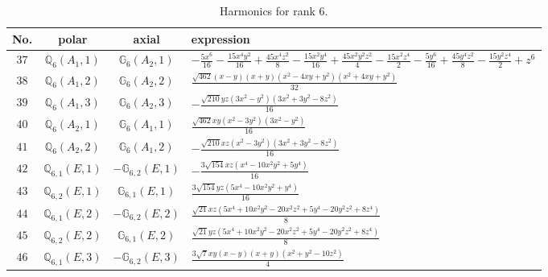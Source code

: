 \documentclass[fleqn,8pt,landscape]{jsarticle}
\begin{document}
\begin{table}[ht!]
\begin{center}
\caption{Harmonics for rank 6.}
\renewcommand{\arraystretch}{1.3}
\begin{tabular}{cccl} \hline \hline
No. & polar & axial & expression \\ \hline
$ 37 $ & $ \mathbb{Q}_{6}(A_{1},1) $ & $ \mathbb{G}_{6}(A_{2},1) $ & $ - \frac{5 x^{6}}{16} - \frac{15 x^{4} y^{2}}{16} + \frac{45 x^{4} z^{2}}{8} - \frac{15 x^{2} y^{4}}{16} + \frac{45 x^{2} y^{2} z^{2}}{4} - \frac{15 x^{2} z^{4}}{2} - \frac{5 y^{6}}{16} + \frac{45 y^{4} z^{2}}{8} - \frac{15 y^{2} z^{4}}{2} + z^{6} $ \\
$ 38 $ & $ \mathbb{Q}_{6}(A_{1},2) $ & $ \mathbb{G}_{6}(A_{2},2) $ & $ \frac{\sqrt{462} \left(x - y\right) \left(x + y\right) \left(x^{2} - 4 x y + y^{2}\right) \left(x^{2} + 4 x y + y^{2}\right)}{32} $ \\
$ 39 $ & $ \mathbb{Q}_{6}(A_{1},3) $ & $ \mathbb{G}_{6}(A_{2},3) $ & $ - \frac{\sqrt{210} y z \left(3 x^{2} - y^{2}\right) \left(3 x^{2} + 3 y^{2} - 8 z^{2}\right)}{16} $ \\
$ 40 $ & $ \mathbb{Q}_{6}(A_{2},1) $ & $ \mathbb{G}_{6}(A_{1},1) $ & $ \frac{\sqrt{462} x y \left(x^{2} - 3 y^{2}\right) \left(3 x^{2} - y^{2}\right)}{16} $ \\
$ 41 $ & $ \mathbb{Q}_{6}(A_{2},2) $ & $ \mathbb{G}_{6}(A_{1},2) $ & $ - \frac{\sqrt{210} x z \left(x^{2} - 3 y^{2}\right) \left(3 x^{2} + 3 y^{2} - 8 z^{2}\right)}{16} $ \\
$ 42 $ & $ \mathbb{Q}_{6,1}(E,1) $ & $ -\mathbb{G}_{6,2}(E,1) $ & $ - \frac{3 \sqrt{154} x z \left(x^{4} - 10 x^{2} y^{2} + 5 y^{4}\right)}{16} $ \\
$ 43 $ & $ \mathbb{Q}_{6,2}(E,1) $ & $ \mathbb{G}_{6,1}(E,1) $ & $ \frac{3 \sqrt{154} y z \left(5 x^{4} - 10 x^{2} y^{2} + y^{4}\right)}{16} $ \\
$ 44 $ & $ \mathbb{Q}_{6,1}(E,2) $ & $ -\mathbb{G}_{6,2}(E,2) $ & $ \frac{\sqrt{21} x z \left(5 x^{4} + 10 x^{2} y^{2} - 20 x^{2} z^{2} + 5 y^{4} - 20 y^{2} z^{2} + 8 z^{4}\right)}{8} $ \\
$ 45 $ & $ \mathbb{Q}_{6,2}(E,2) $ & $ \mathbb{G}_{6,1}(E,2) $ & $ \frac{\sqrt{21} y z \left(5 x^{4} + 10 x^{2} y^{2} - 20 x^{2} z^{2} + 5 y^{4} - 20 y^{2} z^{2} + 8 z^{4}\right)}{8} $ \\
$ 46 $ & $ \mathbb{Q}_{6,1}(E,3) $ & $ -\mathbb{G}_{6,2}(E,3) $ & $ \frac{3 \sqrt{7} x y \left(x - y\right) \left(x + y\right) \left(x^{2} + y^{2} - 10 z^{2}\right)}{4} $ \\

\end{tabular}
\end{center}
\end{table}
\end{document}
